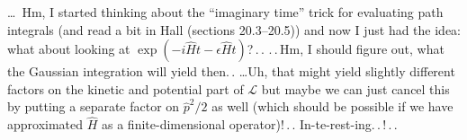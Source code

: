 \documentclass{report}
\begin{document}
\ldots\ Hm, I started thinking about the ``imaginary time'' trick for evaluating path integrals (and read a bit in Hall (sections 20.3--20.5)) and now I just had the idea: what about looking at $\exp(-i \hat H t -\epsilon \hat H t)$?\,.\,.
.\,.\,Hm, I should figure out, what the Gaussian integration will yield then.\,. 
\ldots Uh, that might yield slightly different factors on the kinetic and potential part of $\mathcal{L}$ but maybe we can just cancel this by putting a separate factor on $\hat p^2 / 2$ as well (which should be possible if we have approximated $\hat H$ as a finite-dimensional operator)!\,.\,. In-te-rest-ing.\,.\,!\,.\,. 

\end{document}
